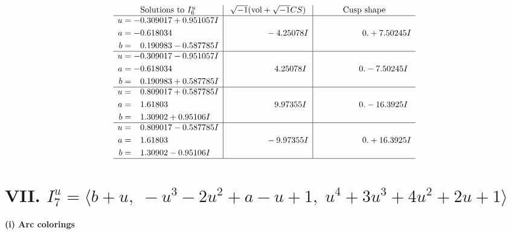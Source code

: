 \documentclass[1p]{elsarticle_modified}
\theoremstyle{definition}
\newcommand{\I}{\sqrt{-1}}
\begin{document}
$$\begin{array}{c|c|c}  
\text{Solutions to }I^u_{6}& \I (\text{vol} + \sqrt{-1}CS) & \text{Cusp shape}\\
 \hline 
\begin{aligned}
u &= -0.309017 + 0.951057 I \\
a &= -0.618034\phantom{ +0.000000I} \\
b &= \phantom{-}0.190983 - 0.587785 I\end{aligned}
 & \phantom{-0.000000 } -4.25078 I & \phantom{-0.000000 -}0. + 7.50245 I \\ \hline\begin{aligned}
u &= -0.309017 - 0.951057 I \\
a &= -0.618034\phantom{ +0.000000I} \\
b &= \phantom{-}0.190983 + 0.587785 I\end{aligned}
 & \phantom{-0.000000 -}4.25078 I & \phantom{-0.000000 } 0. - 7.50245 I \\ \hline\begin{aligned}
u &= \phantom{-}0.809017 + 0.587785 I \\
a &= \phantom{-}1.61803\phantom{ +0.000000I} \\
b &= \phantom{-}1.30902 + 0.95106 I\end{aligned}
 & \phantom{-0.000000 -}9.97355 I & \phantom{-0.000000 } 0. - 16.3925 I \\ \hline\begin{aligned}
u &= \phantom{-}0.809017 - 0.587785 I \\
a &= \phantom{-}1.61803\phantom{ +0.000000I} \\
b &= \phantom{-}1.30902 - 0.95106 I\end{aligned}
 & \phantom{-0.000000 } -9.97355 I & \phantom{-0.000000 -}0. + 16.3925 I\\
 \hline 
 \end{array}$$\newpage\newpage\renewcommand{\arraystretch}{1}
\centering \section*{VII. $I^u_{7}= \langle b+u,\;- u^3-2 u^2+a- u+1,\;u^4+3 u^3+4 u^2+2 u+1 \rangle$}
\flushleft \textbf{(i) Arc colorings}\\
\end{document}

